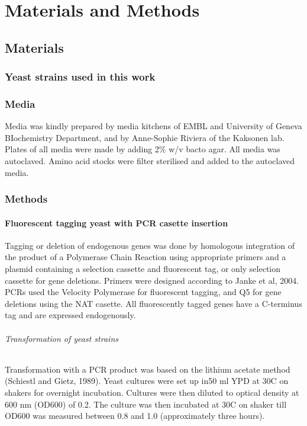 \chapter{Materials and Methods} %

\section{Materials} 
\subsection{Yeast strains used in this work}

\subsection{Media}
Media was kindly prepared by media kitchens of EMBL and University of Geneva BIochemistry Department, and by Anne-Sophie Riviera of the Kaksonen lab. Plates of all media were made by adding 2\% w/v bacto agar.
All media was autoclaved. Amino acid stocks were filter sterilised and added to the autoclaved media.


\subsection{Methods}
\subsubsection{Fluorescent tagging yeast with PCR casette insertion}
Tagging or deletion of endogenous genes was done by homologous integration of the product of a Polymerase Chain Reaction using appropriate primers and a plasmid containing a selection cassette and fluorescent tag, or only selection cassette for gene deletions. Primers were designed according to Janke et al, 2004. PCRs used the Velocity Polymerase for fluorescent tagging, and Q5 for gene deletions using the NAT casette. 
All fluorescently tagged genes have a C-terminus tag and are expressed endogenously.

\subparagraph{Transformation of yeast strains}

Transformation with a PCR product was based on the lithium acetate method (Schiestl and Gietz, 1989). Yeast cultures were set up in50 ml YPD at 30C on shakers for overnight incubation. Cultures were then diluted to optical density at 600 nm (OD600) of 0.2. The culture was then incubated at 30C on shaker till OD600 was measured between 0.8 and 1.0 (approximately three hours).  

